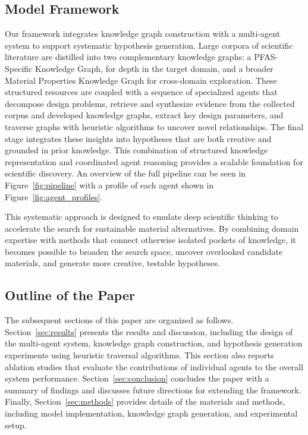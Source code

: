 \subsection{Model Framework}

Our framework integrates knowledge graph construction with a multi-agent system to support systematic hypothesis generation. Large corpora of scientific literature are distilled into two complementary knowledge graphs: a PFAS-Specific Knowledge Graph, for depth in the target domain, and a broader Material Properties Knowledge Graph for cross-domain exploration. These structured resources are coupled with a sequence of specialized agents that decompose design problems, retrieve and synthesize evidence from the collected corpus and developed knowledge graphs, extract key design parameters, and traverse graphs with heuristic algorithms to uncover novel relationships. The final stage integrates these insights into hypotheses that are both creative and grounded in prior knowledge. This combination of structured knowledge representation and coordinated agent reasoning provides a scalable foundation for scientific discovery. An overview of the full pipeline can be seen in Figure~\ref{fig:pipeline} with a profile of each agent shown in Figure~\ref{fig:agent_profiles}. 

This systematic approach is designed to emulate deep scientific thinking to accelerate the search for sustainable material alternatives. By combining domain expertise with methods that connect otherwise isolated pockets of knowledge, it becomes possible to broaden the search space, uncover overlooked candidate materials, and generate more creative, testable hypotheses.

\subsection{Outline of the Paper}

The subsequent sections of this paper are organized as follows. Section~\ref{sec:results} presents the results and discussion, including the design of the multi-agent system, knowledge graph construction, and hypothesis generation experiments using heuristic traversal algorithms. This section also reports ablation studies that evaluate the contributions of individual agents to the overall system performance. Section~\ref{sec:conclusion} concludes the paper with a summary of findings and discusses future directions for extending the framework. Finally, Section~\ref{sec:methods} provides details of the materials and methods, including model implementation, knowledge graph generation, and experimental setup.

